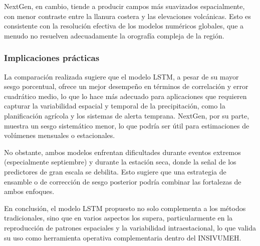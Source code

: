 NextGen, en cambio, tiende a producir campos más suavizados espacialmente, con menor contraste entre la llanura costera y las elevaciones volcánicas. Esto es consistente con la resolución efectiva de los modelos numéricos globales, que a menudo no resuelven adecuadamente la orografía compleja de la región.

\subsubsection*{Implicaciones prácticas}

La comparación realizada sugiere que el modelo LSTM, a pesar de su mayor sesgo porcentual, ofrece un mejor desempeño en términos de correlación y error cuadrático medio, lo que lo hace más adecuado para aplicaciones que requieren capturar la variabilidad espacial y temporal de la precipitación, como la planificación agrícola y los sistemas de alerta temprana. NextGen, por su parte, muestra un sesgo sistemático menor, lo que podría ser útil para estimaciones de volúmenes mensuales o estacionales.

No obstante, ambos modelos enfrentan dificultades durante eventos extremos (especialmente septiembre) y durante la estación seca, donde la señal de los predictores de gran escala se debilita. Esto sugiere que una estrategia de ensamble o de corrección de sesgo posterior podría combinar las fortalezas de ambos enfoques.

En conclusión, el modelo LSTM propuesto no solo complementa a los métodos tradicionales, sino que en varios aspectos los supera, particularmente en la reproducción de patrones espaciales y la variabilidad intraestacional, lo que valida su uso como herramienta operativa complementaria dentro del INSIVUMEH.
